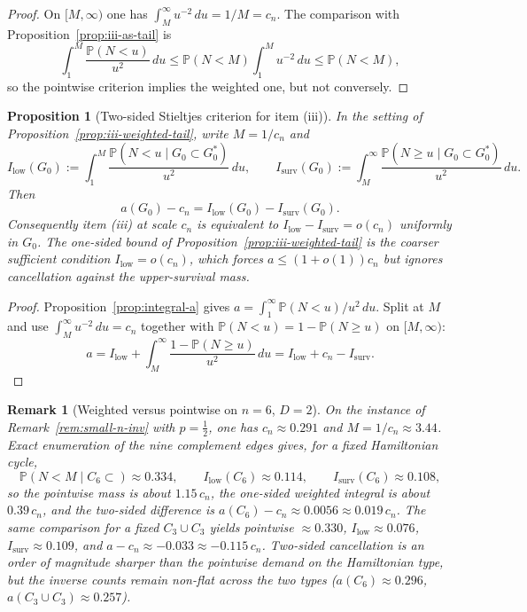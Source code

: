 \documentclass[11pt]{article}
\newtheorem{proposition}[theorem]{Proposition}
\newtheorem{remark}[theorem]{Remark}
\newcommand{\PP}{\mathbb{P}}
\begin{document}
\begin{proof}
On \([M,\infty)\) one has \(\int_M^\infty u^{-2}\,du=1/M=c_n\). The comparison
with Proposition~\ref{prop:iii-as-tail} is
\[
\int_1^{M}\frac{\PP(N<u)}{u^2}\,du
\le
\PP(N<M)\int_1^{M}u^{-2}\,du
\le
\PP(N<M),
\]
so the pointwise criterion implies the weighted one, but not conversely.
\end{proof}

\begin{proposition}[Two-sided Stieltjes criterion for item (iii)]
\label{prop:iii-two-sided}
In the setting of Proposition~\ref{prop:iii-weighted-tail}, write
\(M=1/c_n\) and
\[
I_{\mathrm{low}}(G_0)
:=
\int_1^{M}\frac{\PP(N<u\mid G_0\subset G^*_0)}{u^2}\,du,
\qquad
I_{\mathrm{surv}}(G_0)
:=
\int_M^{\infty}\frac{\PP(N\ge u\mid G_0\subset G^*_0)}{u^2}\,du.
\]
Then
\[
a(G_0)-c_n
=
I_{\mathrm{low}}(G_0)-I_{\mathrm{surv}}(G_0).
\]
Consequently item (iii) at scale \(c_n\) is equivalent to
\(I_{\mathrm{low}}-I_{\mathrm{surv}}=o(c_n)\) uniformly in \(G_0\).
The one-sided bound of Proposition~\ref{prop:iii-weighted-tail} is the coarser
sufficient condition \(I_{\mathrm{low}}=o(c_n)\), which forces
\(a\le(1+o(1))c_n\) but ignores cancellation against the upper-survival mass.
\end{proposition}

\begin{proof}
Proposition~\ref{prop:integral-a} gives
\(a=\int_1^\infty\PP(N<u)/u^2\,du\). Split at \(M\) and use
\(\int_M^\infty u^{-2}\,du=c_n\) together with
\(\PP(N<u)=1-\PP(N\ge u)\) on \([M,\infty)\):
\[
a
=
I_{\mathrm{low}}
+
\int_M^\infty\frac{1-\PP(N\ge u)}{u^2}\,du
=
I_{\mathrm{low}}+c_n-I_{\mathrm{surv}}.
\]
\end{proof}

\begin{remark}[Weighted versus pointwise on \(n=6\), \(D=2\)]
\label{rem:iii-weighted-n6}
On the instance of Remark~\ref{rem:small-n-inv} with \(p=\tfrac12\), one has
\(c_n\approx 0.291\) and \(M=1/c_n\approx 3.44\). Exact enumeration of the nine
complement edges gives, for a fixed Hamiltonian cycle,
\[
\PP(N<M\mid C_6\subset)\approx 0.334,
\qquad
I_{\mathrm{low}}(C_6)\approx 0.114,
\qquad
I_{\mathrm{surv}}(C_6)\approx 0.108,
\]
so the pointwise mass is about \(1.15\,c_n\), the one-sided weighted integral is
about \(0.39\,c_n\), and the two-sided difference is
\(a(C_6)-c_n\approx 0.0056\approx 0.019\,c_n\). The same comparison for a fixed
\(C_3\cup C_3\) yields pointwise \(\approx 0.330\),
\(I_{\mathrm{low}}\approx 0.076\), \(I_{\mathrm{surv}}\approx 0.109\), and
\(a-c_n\approx -0.033\approx -0.115\,c_n\). Two-sided cancellation is an order of
magnitude sharper than the pointwise demand on the Hamiltonian type, but the
inverse counts remain non-flat across the two types
(\(a(C_6)\approx 0.296\), \(a(C_3\cup C_3)\approx 0.257\)).
\end{remark}
\end{document}
